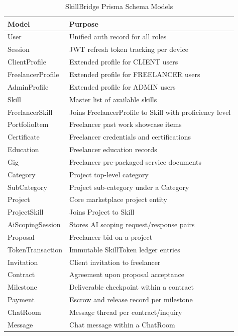 \begin{table}[h]
\centering
\caption{SkillBridge Prisma Schema Models}
\label{tab:schema_models}
\begin{tabular}{|p{4cm}|p{9.5cm}|}
\hline
\textbf{Model} & \textbf{Purpose} \\ \hline
User & Unified auth record for all roles \\ \hline
Session & JWT refresh token tracking per device \\ \hline
ClientProfile & Extended profile for CLIENT users \\ \hline
FreelancerProfile & Extended profile for FREELANCER users \\ \hline
AdminProfile & Extended profile for ADMIN users \\ \hline
Skill & Master list of available skills \\ \hline
FreelancerSkill & Joins FreelancerProfile to Skill with proficiency level \\ \hline
PortfolioItem & Freelancer past work showcase items \\ \hline
Certificate & Freelancer credentials and certifications \\ \hline
Education & Freelancer education records \\ \hline
Gig & Freelancer pre-packaged service documents \\ \hline
Category & Project top-level category \\ \hline
SubCategory & Project sub-category under a Category \\ \hline
Project & Core marketplace project entity \\ \hline
ProjectSkill & Joins Project to Skill \\ \hline
AiScopingSession & Stores AI scoping request/response pairs \\ \hline
Proposal & Freelancer bid on a project \\ \hline
TokenTransaction & Immutable SkillToken ledger entries \\ \hline
Invitation & Client invitation to freelancer \\ \hline
Contract & Agreement upon proposal acceptance \\ \hline
Milestone & Deliverable checkpoint within a contract \\ \hline
Payment & Escrow and release record per milestone \\ \hline
ChatRoom & Message thread per contract/inquiry \\ \hline
Message & Chat message within a ChatRoom \\ \hline

\end{tabular}
\end{table}
